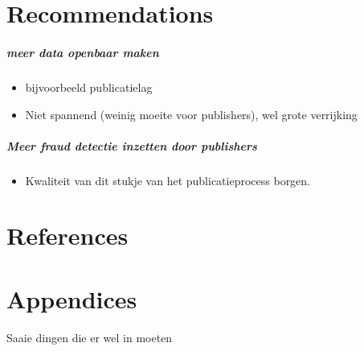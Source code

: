 \documentclass{ou-report}
\newcommand{\outline}[1]{{\color{blue} #1}}
\begin{document}
\chapter{Recommendations}
\label{chp:recommendations}
\outline {
\paragraph{meer data openbaar maken}
\begin{itemize}
    \item bijvoorbeeld publicatielag
    \item Niet spannend (weinig moeite voor publishers), wel grote verrijking
\end{itemize}
\paragraph{Meer fraud detectie inzetten door publishers}
\begin{itemize}
    \item Kwaliteit van dit stukje van het publicatieprocess borgen.
\end{itemize}
}

\chapter{References}



\backmatter
{}





\chapter{Appendices}
\outline{
Saaie dingen die er wel in moeten
}

\appendix
%  
%  
%  
\end{document}
